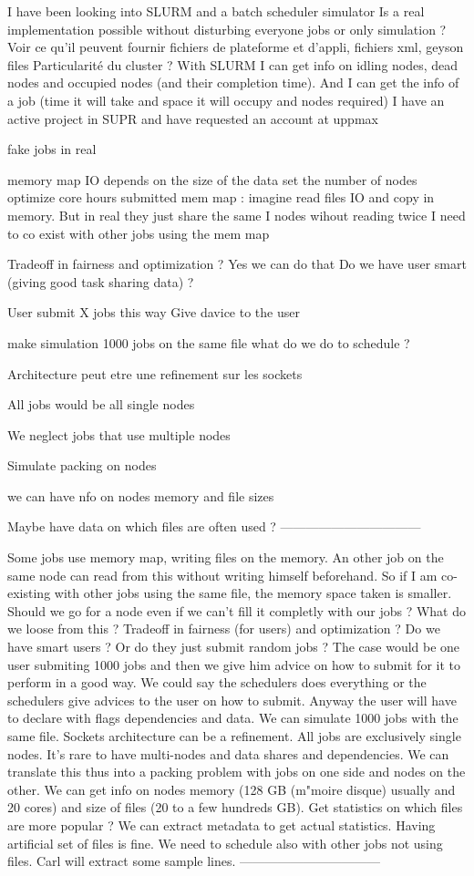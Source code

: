 \documentclass[a4paper]{article}
\begin{document}
I have been looking into SLURM and a batch scheduler simulator
Is a real implementation possible without disturbing everyone jobs or only simulation ?
Voir ce qu'il peuvent fournir fichiers de plateforme et d'appli, fichiers xml, geyson files
Particularité du cluster ?
With SLURM I can get info on idling nodes, dead nodes and occupied nodes (and their completion time). And I can get the info of a job (time it will take and space it will occupy and nodes required)
I have an active project in SUPR and have requested an account at uppmax

fake jobs in real

memory map IO depends on the size of the data set the number of nodes
optimize core hours submitted
mem map : imagine read files IO and copy in memory. But in real they just share the same I nodes wihout reading twice
I need to co exist with other jobs using the mem map

Tradeoff in fairness and optimization ? Yes we can do that
Do we have user smart (giving good task sharing data) ?

User submit X jobs this way
Give davice to the user

make simulation 1000 jobs on the same file what do we do to schedule ?

Architecture peut etre une refinement sur les sockets

All jobs would be all single nodes

We neglect jobs that use multiple nodes

Simulate packing on nodes

we can have nfo on nodes memory and file sizes

Maybe have data on which files are often used ?
---------------------------------

Some jobs use memory map, writing files on the memory. An other job on the same node can read from this without writing himself beforehand. So if I am co-existing with other jobs using the same file, the memory space taken is smaller.
Should we go for a node even if we can't fill it completly with our jobs ? What do we loose from this ?
Tradeoff in fairness (for users) and optimization ?
Do we have smart users ? Or do they just submit random jobs ? The case would be one user submiting 1000 jobs and then we give him advice on how to submit for it to perform in a good way. We could say the schedulers does everything or the schedulers give advices to the user on how to submit. Anyway the user will have to declare with flags dependencies and data. We can simulate 1000 jobs with the same file.
Sockets architecture can be a refinement.
All jobs are exclusively single nodes. It's rare to have multi-nodes and data shares and dependencies. We can translate this thus into a packing problem with jobs on one side and nodes on the other.
We can get info on nodes memory (128 GB (m"moire disque) usually and 20 cores) and size of files (20 to a few hundreds GB).
Get statistics on which files are more popular ? We can extract metadata to get actual statistics. Having artificial set of files is fine.
We need to schedule also with other jobs not using files.
Carl will extract some sample lines.
---------------------------------
\end{document}
